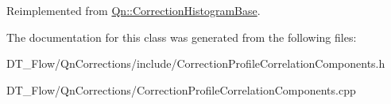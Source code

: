 Reimplemented from \mbox{\hyperlink{classQn_1_1CorrectionHistogramBase_aec361c84c8291093f17ae6839384eeb9}{Qn\+::\+Correction\+Histogram\+Base}}.



The documentation for this class was generated from the following files\+:\begin{DoxyCompactItemize}
\item 
D\+T\+\_\+\+Flow/\+Qn\+Corrections/include/Correction\+Profile\+Correlation\+Components.\+h\item 
D\+T\+\_\+\+Flow/\+Qn\+Corrections/Correction\+Profile\+Correlation\+Components.\+cpp\end{DoxyCompactItemize}
